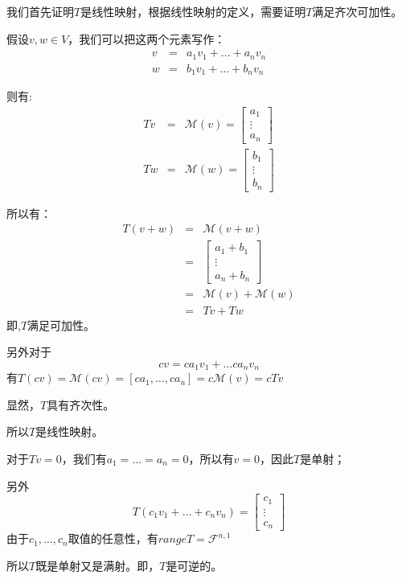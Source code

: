 \documentclass[10pt,a4paper,UTF8]{article}
\begin{document}
\begin{answer}
我们首先证明\(T\)是线性映射，根据线性映射的定义，需要证明\(T\)满足齐次可加性。

假设\(v,w\in V\)，我们可以把这两个元素写作：
\begin{eqnarray*}
v&=&a_{1}v_{1} + \ldots + a_{n}v_{n} \\
w&=&b_{1}v_{1} + \ldots + b_{n}v_{n}
\end{eqnarray*}

则有:
\begin{eqnarray}
\label{eq:11}
Tv&=& \mathcal{M}(v) =
 \begin{bmatrix}
a_{1} \\ \vdots \\ a_{n}
\end{bmatrix}
\\
Tw&=&  \mathcal{M}(w) =
 \begin{bmatrix}
b_{1} \\ \vdots \\ b_{n}
\end{bmatrix}
\end{eqnarray}

所以有：
\begin{eqnarray*}
T(v+w)&=& \mathcal{M}(v+w) \\
&=&
\begin{bmatrix}
a_{1} + b_{1} \\ \vdots \\ a_{n} + b_{n}
\end{bmatrix}
\\
&=& \mathcal{M}(v) + \mathcal{M}(w) \\
&=&Tv + Tw
\end{eqnarray*}
即,\(T\)满足可加性。

另外对于
\begin{equation*}
cv = ca_{1}v_{1} + \ldots ca_{n}v_{n}
\end{equation*}
有\(T(cv) = \mathcal{M}(cv) = [ca_{1},\ldots ,ca_{n}] =c \mathcal{M}(v) = cTv\) 

显然，\(T\)具有齐次性。

所以\(T\)是线性映射。

对于\(Tv = 0\)，我们有\(a_{1} = \ldots = a_{n} = 0\)，所以有\(v = 0\)，因此\(T\)是单射；

另外
\begin{equation}
\label{eq:24}
T(c_{1}v_{1} + \ldots + c_{n}v_{n}) =
\begin{bmatrix}
c_{1} \\
\vdots \\
c_{n}
\end{bmatrix}
\end{equation}
由于\(c_{1},\ldots ,c_{n}\)取值的任意性，有\(range T = \mathcal{F}^{n,1}\)

所以\(T\)既是单射又是满射。即，\(T\)是可逆的。
\end{answer}
\end{document}
